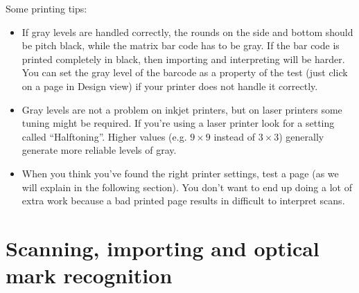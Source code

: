\documentclass[10pt,a4paper]{article}
\begin{document}
Some printing tips:
\begin{itemize}
\item If gray levels are handled correctly, the rounds on the side and bottom should be pitch black, while the matrix bar code has to be gray. If the bar code is printed completely in black, then importing and interpreting will be harder. You can set the gray level of the barcode as a property of the test (just click on a page in Design view) if your printer does not handle it correctly. 
\item Gray levels are not a problem on inkjet printers, but on laser printers some tuning might be required. If you're using a laser printer look for a setting called ``Halftoning''. Higher values (e.g. $9\times9$ instead of $3\times3$) generally generate more reliable levels of gray.
\item When you think you've found the right printer settings, test a page (as we will explain in the following section). You don't want to end up doing a lot of extra work because a bad printed page results in difficult to interpret scans.
\end{itemize}


\section{Scanning, importing and optical mark recognition}
\end{document}
